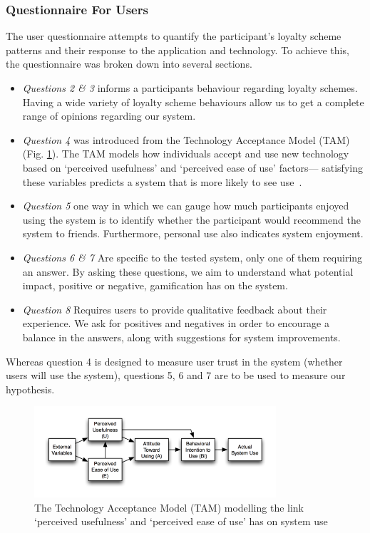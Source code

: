 \subsubsection{Questionnaire For Users}
The user questionnaire attempts to quantify the participant's loyalty scheme patterns and their response to the application and technology. To achieve this, the questionnaire was broken down into several sections.
\begin{itemize}
	\item \emph{Questions 2 \& 3} informs a participants behaviour regarding loyalty schemes. Having a wide variety of loyalty scheme behaviours allow us to get a complete range of opinions regarding our system.
	\item \emph{Question 4} was introduced from the Technology Acceptance Model (TAM)~\cite{tam} (Fig. \ref{fig:TAM}). The TAM models how individuals accept and use new technology based on `perceived usefulness' and `perceived ease of use' factors--- satisfying these variables predicts a system that is more likely to see use~\cite{tam}.
	\item \emph{Question 5} one way in which we can gauge how much participants enjoyed using the system is to identify whether the participant would recommend the system to friends. Furthermore, personal use also indicates system enjoyment.  
	\item \emph{Questions 6 \& 7} Are specific to the tested system, only one of them requiring an answer. By asking these questions, we aim to understand what potential impact, positive or negative, gamification has on the system. 
	\item \emph{Question 8} Requires users to provide qualitative feedback about their experience. We ask for positives and negatives in order to encourage a balance in the answers, along with suggestions for system improvements.
\end{itemize}

Whereas question 4 is designed to measure user trust in the system (whether users will use the system), questions 5, 6 and 7 are to be used to measure our hypothesis.

\begin{figure}[H]
 \centering
  \includegraphics[width=0.80\textwidth]{img/TAM.png}
     \caption{The Technology Acceptance Model (TAM) modelling the link `perceived usefulness' and `perceived ease of use' has on system use }
     \label{fig:TAM}
\end{figure}

